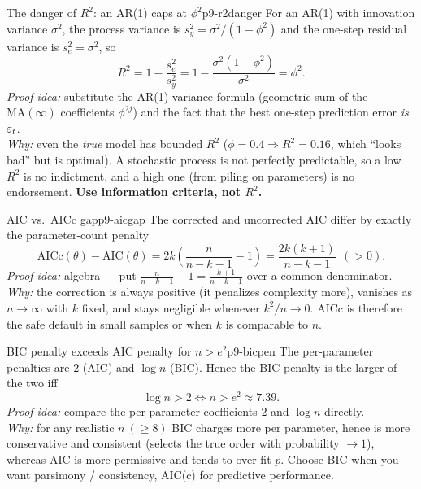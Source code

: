 \begin{proposition}{The danger of $R^2$: an AR(1) caps at $\phi^2$}{p9-r2danger}
For an AR(1) with innovation variance $\sigma^2$, the process variance is
$s_y^2=\sigma^2/(1-\phi^2)$ and the one-step residual variance is
$s_e^2=\sigma^2$, so
\[
R^2 = 1-\frac{s_e^2}{s_y^2}
    = 1-\frac{\sigma^2(1-\phi^2)}{\sigma^2}
    = \phi^2 .
\]
\textit{Proof idea:} substitute the AR(1) variance formula (geometric sum of the
$\mathrm{MA}(\infty)$ coefficients $\phi^{2j}$) and the fact that the best
one-step prediction error \emph{is} $\varepsilon_t$.\\
\textit{Why:} even the \emph{true} model has bounded $R^2$ ($\phi=0.4\Rightarrow
R^2=0.16$, which ``looks bad'' but is optimal). A stochastic process is not
perfectly predictable, so a low $R^2$ is no indictment, and a high one (from
piling on parameters) is no endorsement. \textbf{Use information criteria, not
$R^2$.}
\end{proposition}

\begin{proposition}{AIC vs.\ AICc gap}{p9-aicgap}
The corrected and uncorrected AIC differ by exactly the parameter-count penalty
\[
\mathrm{AICc}(\theta)-\mathrm{AIC}(\theta)
= 2k\left(\frac{n}{n-k-1}-1\right) = \frac{2k(k+1)}{n-k-1}\ \ (>0).
\]
\textit{Proof idea:} algebra --- put $\frac{n}{n-k-1}-1=\frac{k+1}{n-k-1}$ over a
common denominator.\\
\textit{Why:} the correction is always positive (it penalizes complexity more),
vanishes as $n\to\infty$ with $k$ fixed, and stays negligible whenever
$k^2/n\to0$. AICc is therefore the safe default in small samples or when $k$ is
comparable to $n$.
\end{proposition}

\begin{proposition}{BIC penalty exceeds AIC penalty for $n>e^2$}{p9-bicpen}
The per-parameter penalties are $2$ (AIC) and $\log n$ (BIC). Hence the BIC
penalty is the larger of the two iff
\[
\log n > 2 \iff n > e^2 \approx 7.39 .
\]
\textit{Proof idea:} compare the per-parameter coefficients $2$ and $\log n$
directly.\\
\textit{Why:} for any realistic $n\ (\ge 8)$ BIC charges more per parameter,
hence is more conservative and consistent (selects the true order with
probability $\to1$), whereas AIC is more permissive and tends to over-fit
$p$. Choose BIC when you want parsimony / consistency, AIC(c) for predictive
performance.
\end{proposition}

